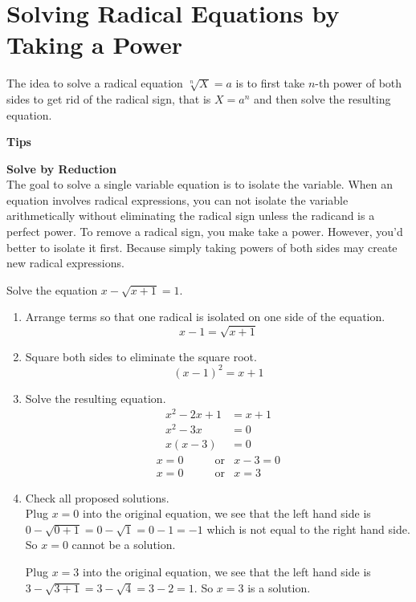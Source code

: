 \documentclass[en,12pt]{elegantbook}
\newenvironment{rmdtip}{
	\par\noindent
	{
		\makebox[-\width][r]{
			\footnotesize\color{red!90}
            \HandRight
			\hspace*{1pt}
		}
			\textbf{
				\color{second}
				\hspace*{3pt}
				Tips 
			}
    }
    \begin{shaded}
    \sffamily
}{
    \par\medskip\ignorespacesafterend
    \end{shaded}
}
\let\BeginKnitrBlock\begin \let\EndKnitrBlock\end
\begin{document}
\hypertarget{solving-radical-equations-by-taking-a-power}{%
\section{Solving Radical Equations by Taking a Power}\label{solving-radical-equations-by-taking-a-power}}

The idea to solve a radical equation \(\sqrt[n]{X}=a\) is to first take \(n\)-th power of both sides to get rid of the radical sign, that is \(X=a^n\) and then solve the resulting equation.

\begin{rmdtip}

\textbf{Solve by Reduction}\\
The goal to solve a single variable equation is to isolate the variable. When an equation involves radical expressions, you can not isolate the variable arithmetically without eliminating the radical sign unless the radicand is a perfect power. To remove a radical sign, you make take a power. However, you'd better to isolate it first. Because simply taking powers of both sides may create new radical expressions.

\end{rmdtip}

\BeginKnitrBlock{example}
\protect\hypertarget{exm:unnamed-chunk-156}{}{\label{exm:unnamed-chunk-156} }
Solve the equation \(x-\sqrt{x+1}=1.\)
\EndKnitrBlock{example}

\BeginKnitrBlock{solution}


\begin{enumerate}
\def\labelenumi{\arabic{enumi}.}
\item
  Arrange terms so that one radical is isolated on one side of the equation.
  \[x-1=\sqrt{x+1}\]
\item
  Square both sides to eliminate the square root.
  \[(x-1)^2=x+1\]
\item
  Solve the resulting equation.
  \[
     \begin{aligned}
         x^2-2x+1&=x+1\\
         x^2-3x&=0\\
         x(x-3)&=0
     \end{aligned}
  \]
  \[
  \begin{aligned}
     x =0 & \qquad \text{or} & x-3 =0 \\
     x =0 & \qquad \text{or} & x   =3
  \end{aligned}
  \]
\item
  Check all proposed solutions.\\
  Plug \(x=0\) into the original equation, we see that the left hand side is \(0-\sqrt{0+1}=0-\sqrt{1}=0-1=-1\) which is not equal to the right hand side. So \(x=0\) cannot be a solution.

  Plug \(x=3\) into the original equation, we see that the left hand side is \(3-\sqrt{3+1}=3-\sqrt{4}=3-2=1\). So \(x=3\) is a solution.
\end{enumerate}
\EndKnitrBlock{solution}
\end{document}
